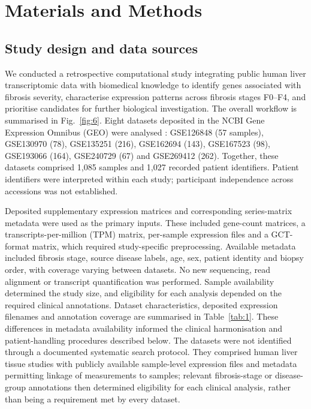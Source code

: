\documentclass[11pt,a4paper]{article}
\begin{document}
\section*{Materials and Methods}
\subsection*{Study design and data sources}
We conducted a retrospective computational study integrating public human liver transcriptomic data with biomedical knowledge to identify genes associated with fibrosis severity, characterise expression patterns across fibrosis stages F0–F4, and prioritise candidates for further biological investigation. The overall workflow is summarised in Fig.~\ref{fig:6}. Eight datasets deposited in the NCBI Gene Expression Omnibus (GEO) were analysed \cite{ref8}: GSE126848 (57 samples), GSE130970 (78), GSE135251 (216), GSE162694 (143), GSE167523 (98), GSE193066 (164), GSE240729 (67) and GSE269412 (262). Together, these datasets comprised 1,085 samples and 1,027 recorded patient identifiers. Patient identifiers were interpreted within each study; participant independence across accessions was not established.

Deposited supplementary expression matrices and corresponding series-matrix metadata were used as the primary inputs. These included gene-count matrices, a transcripts-per-million (TPM) matrix, per-sample expression files and a GCT-format matrix, which required study-specific preprocessing. Available metadata included fibrosis stage, source disease labels, age, sex, patient identity and biopsy order, with coverage varying between datasets. No new sequencing, read alignment or transcript quantification was performed. Sample availability determined the study size, and eligibility for each analysis depended on the required clinical annotations. Dataset characteristics, deposited expression filenames and annotation coverage are summarised in Table~\ref{tab:1}. These differences in metadata availability informed the clinical harmonisation and patient-handling procedures described below. The datasets were not identified through a documented systematic search protocol. They comprised human liver tissue studies with publicly available sample-level expression files and metadata permitting linkage of measurements to samples; relevant fibrosis-stage or disease-group annotations then determined eligibility for each clinical analysis, rather than being a requirement met by every dataset.
\end{document}
